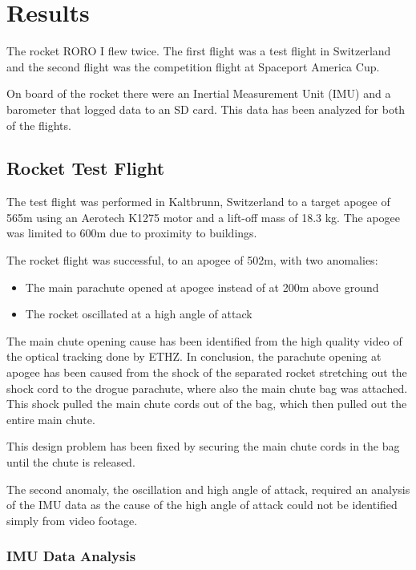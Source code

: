 \section{Results}
\label{sec:results}

The rocket RORO I flew twice. The first flight was a test flight in Switzerland and the second flight was the competition flight at Spaceport America Cup.

On board of the rocket there were an Inertial Measurement Unit (IMU) and a barometer that logged data to an SD card.
This data has been analyzed for both of the flights.

\subsection{Rocket Test Flight}
\label{subsection:flightTests}

The test flight was performed in Kaltbrunn, Switzerland to a target apogee of 565m using an Aerotech K1275 motor and a lift-off mass of 18.3 kg. The apogee was limited to 600m due to proximity to buildings.

The rocket flight was successful, to an apogee of 502m, with two anomalies:
\begin{itemize}
    \item The main parachute opened at apogee instead of at 200m above ground
    \item The rocket oscillated at a high angle of attack
\end{itemize}

The main chute opening cause has been identified from the high quality video of the optical tracking done by ETHZ.
In conclusion, the parachute opening at apogee has been caused from the shock of the separated rocket stretching out the shock cord to the drogue parachute, where also the main chute bag was attached.
This shock pulled the main chute cords out of the bag, which then pulled out the entire main chute.

This design problem has been fixed by securing the main chute cords in the bag until the chute is released.

The second anomaly, the oscillation and high angle of attack, required an analysis of the IMU data as the cause of the high angle of attack could not be identified simply from video footage.

\subsubsection{IMU Data Analysis}


